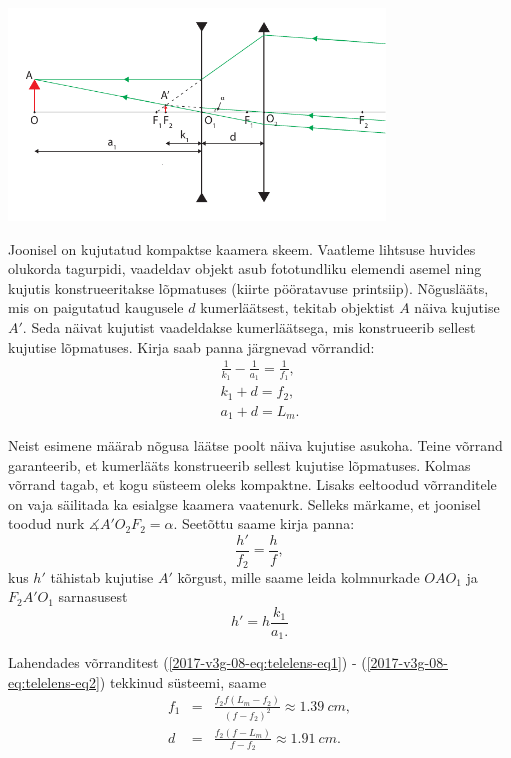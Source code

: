 \documentclass[11pt]{article}
\begin{document}
{{\begin{center}
	\includegraphics[width=10cm]{2017-v3g-08-skeem__telephoto.pdf}
\end{center}
Joonisel on kujutatud kompaktse kaamera skeem. Vaatleme lihtsuse huvides
olukorda tagurpidi, vaadeldav objekt asub fototundliku elemendi asemel
ning kujutis konstrueeritakse lõpmatuses (kiirte pööratavuse printsiip).
Nõguslääts, mis on paigutatud kaugusele $d$ kumerläätsest, tekitab
objektist $A$ näiva kujutise $A'$. Seda näivat kujutist vaadeldakse
kumerläätsega, mis konstrueerib sellest kujutise lõpmatuses. Kirja
saab panna järgnevad võrrandid:
\begin{eqnarray}
\frac{1}{k_{1}}-\frac{1}{a_{1}} = \frac{1}{f_{1}}, \label{2017-v3g-08-eq:telelens-eq1}\\
k_{1}+d = f_{2},\\
a_{1}+d = L_{m}.
\end{eqnarray}

\noindent Neist esimene määrab nõgusa läätse poolt näiva kujutise asukoha.
Teine võrrand garanteerib, et kumerlääts konstrueerib sellest kujutise
lõpmatuses. Kolmas võrrand tagab, et kogu süsteem oleks kompaktne.
Lisaks eeltoodud võrranditele on vaja säilitada ka esialgse kaamera
vaatenurk. Selleks märkame, et joonisel toodud nurk $\measuredangle A'O_{2}F_{2}=\alpha.$
Seetõttu saame kirja panna:
\begin{equation}
\frac{h'}{f_{2}}=\frac{h}{f},
\end{equation}
\noindent kus $h'$ tähistab kujutise $A'$ kõrgust, mille saame leida
kolmnurkade $OAO_{1}$ ja $F_{2}A'O_{1}$ sarnasusest
\begin{equation}
h'=h\frac{k_{1}}{a_{1}.}\label{2017-v3g-08-eq:telelens-eq2}
\end{equation}

Lahendades võrranditest (\ref{2017-v3g-08-eq:telelens-eq1}) - (\ref{2017-v3g-08-eq:telelens-eq2})
tekkinud süsteemi, saame
\begin{eqnarray*}
f_{1} & = & \frac{f_{2}f(L_{m}-f_{2})}{\left(f-f_{2}\right)^{2}}\approx\SI{1.39}{cm},\\
d & = & \frac{f_{2}(f-L_{m})}{f-f_{2}}\approx\SI{1.91}{cm}.
\end{eqnarray*}
\fi
}

}
\end{document}
